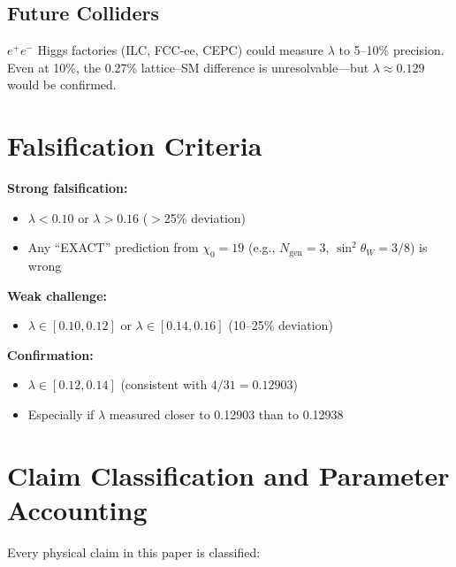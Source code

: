 \documentclass[12pt,a4paper]{article}
\newcommand{\chizero}{\chi_0}
\newcommand{\Ngen}{N_{\mathrm{gen}}}
\begin{document}
\subsection{Future Colliders}

$e^+e^-$ Higgs factories (ILC, FCC-ee, CEPC) could measure $\lambda$ to 5--10\% precision. Even at 10\%, the 0.27\% lattice--SM difference is unresolvable---but $\lambda \approx 0.129$ would be confirmed.


\section{Falsification Criteria}\label{sec:falsification}

\textbf{Strong falsification:}
\begin{itemize}
\item $\lambda < 0.10$ or $\lambda > 0.16$ ($>$25\% deviation)
\item Any ``EXACT'' prediction from $\chizero = 19$ (e.g., $\Ngen = 3$, $\sin^2\theta_W = 3/8$) is wrong
\end{itemize}

\textbf{Weak challenge:}
\begin{itemize}
\item $\lambda \in [0.10, 0.12]$ or $\lambda \in [0.14, 0.16]$ (10--25\% deviation)
\end{itemize}

\textbf{Confirmation:}
\begin{itemize}
\item $\lambda \in [0.12, 0.14]$ (consistent with $4/31 = 0.12903$)
\item Especially if $\lambda$ measured closer to 0.12903 than to 0.12938
\end{itemize}


\section{Claim Classification and Parameter Accounting}\label{sec:claims}

Every physical claim in this paper is classified:
\end{document}
